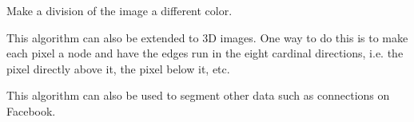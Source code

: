 \begin{problem}
Make a division of the image a different color.
\end{problem}

This algorithm can also be extended to 3D images.
One way to do this is to make each pixel a node and have the edges run in the eight cardinal directions, i.e. the pixel directly above it, the pixel below it, etc.

This algorithm can also be used to segment other data such as connections on Facebook. 
